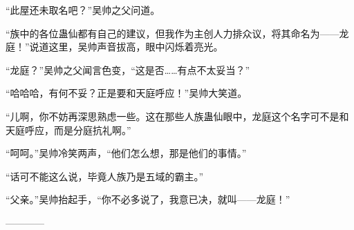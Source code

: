 \begin{this_body}
“此屋还未取名吧？”吴帅之父问道。

“族中的各位蛊仙都有自己的建议，但我作为主创人力排众议，将其命名为——龙庭！”说道这里，吴帅声音拔高，眼中闪烁着亮光。

“龙庭？”吴帅之父闻言色变，“这是否……有点不太妥当？”

“哈哈哈，有何不妥？正是要和天庭呼应！”吴帅大笑道。

“儿啊，你不妨再深思熟虑一些。这在那些人族蛊仙眼中，龙庭这个名字可不是和天庭呼应，而是分庭抗礼啊。”

“呵呵。”吴帅冷笑两声，“他们怎么想，那是他们的事情。”

“话可不能这么说，毕竟人族乃是五域的霸主。”

“父亲。”吴帅抬起手，“你不必多说了，我意已决，就叫——龙庭！”

------------

\end{this_body}

